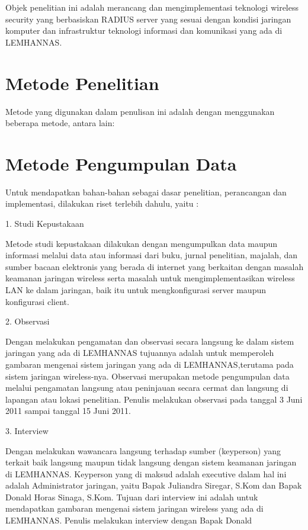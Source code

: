 \documentclass{jtetiproposalskripsi}
\begin{document}
Objek penelitian ini adalah merancang dan mengimplementasi teknologi wireless security yang berbasiskan RADIUS server yang sesuai dengan kondisi jaringan komputer dan infrastruktur teknologi informasi dan komunikasi yang ada di LEMHANNAS.



\section{Metode Penelitian}

Metode yang digunakan dalam penulisan ini adalah dengan menggunakan beberapa metode, antara lain:

\section{Metode Pengumpulan Data}

Untuk mendapatkan bahan-bahan sebagai dasar penelitian, perancangan dan implementasi, dilakukan riset terlebih dahulu, yaitu :

1. Studi Kepustakaan

Metode studi kepustakaan dilakukan dengan mengumpulkan data maupun informasi melalui data atau informasi dari buku, jurnal
penelitian, majalah, dan sumber bacaan elektronis yang berada di internet yang berkaitan dengan masalah keamanan jaringan wireless serta masalah untuk mengimplementasikan wireless LAN ke dalam jaringan, baik itu untuk mengkonfigurasi server maupun konfigurasi client.

2. Observasi

Dengan melakukan pengamatan dan observasi secara langsung ke
dalam sistem jaringan yang ada di LEMHANNAS tujuannya adalah untuk memperoleh gambaran mengenai sistem jaringan yang ada di
LEMHANNAS,terutama pada sistem jaringan wireless-nya.
Observasi merupakan metode pengumpulan data melalui pengamatan langsung atau peninjauan secara cermat dan langsung di lapangan atau lokasi penelitian. Penulis melakukan observasi pada tanggal 3 Juni 2011 sampai tanggal 15 Juni 2011.

3. Interview

Dengan melakukan wawancara langsung terhadap sumber (keyperson)
yang terkait baik langsung maupun tidak langsung dengan sistem keamanan jaringan di LEMHANNAS. Keyperson yang di maksud adalah executive dalam hal ini adalah Administrator jaringan, yaitu
Bapak Juliandra Siregar, S.Kom dan Bapak Donald Horas Sinaga,
S.Kom. Tujuan dari interview ini adalah untuk mendapatkan gambaran mengenai sistem jaringan wireless yang ada di LEMHANNAS. Penulis melakukan interview dengan Bapak Donald 
\end{document}

